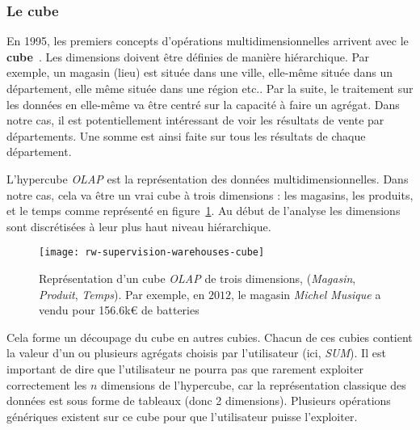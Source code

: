 \subsubsection{Le cube}
En 1995, les premiers concepts d'opérations multidimensionnelles arrivent avec le \textbf{cube}~\cite{Gray:cube}. Les dimensions doivent être définies de manière hiérarchique. Par exemple, un magasin (lieu) est située dans une ville, elle-même située dans un département, elle même située dans une région etc.. Par la suite, le traitement sur les données en elle-même va être centré sur la capacité à faire un agrégat. Dans notre cas, il est potentiellement intéressant de voir les résultats de vente par départements. Une somme est ainsi faite sur tous les résultats de chaque département.

L'hypercube \textit{OLAP} est la représentation des données multidimensionnelles. Dans notre cas, cela va être un vrai cube à trois dimensions : les magasins, les produits, et le temps comme représenté en figure~\ref{fig:rw:supervision:warehouses:cube}. Au début de l'analyse les dimensions sont discrétisées à leur plus haut niveau hiérarchique.
\begin{figure}[ht]
	\centering
	\texttt{[image: rw-supervision-warehouses-cube]}
	\caption{Représentation d'un cube \textit{OLAP} de trois dimensions, (\textit{Magasin}, \textit{Produit}, \textit{Temps}). Par exemple, en $2012$, le magasin \textit{Michel Musique} a vendu pour 156.6k\euro{} de batteries}\label{fig:rw:supervision:warehouses:cube}
\end{figure}
Cela forme un découpage du cube en autres cubies. Chacun de ces cubies contient la valeur d'un ou plusieurs agrégats choisis par l'utilisateur (ici, \textit{SUM}). Il est important de dire que l'utilisateur ne pourra pas que rarement exploiter correctement les $n$ dimensions de l'hypercube, car la représentation classique des données est sous forme de tableaux (donc 2 dimensions). Plusieurs opérations génériques existent sur ce cube pour que l'utilisateur puisse l'exploiter.

